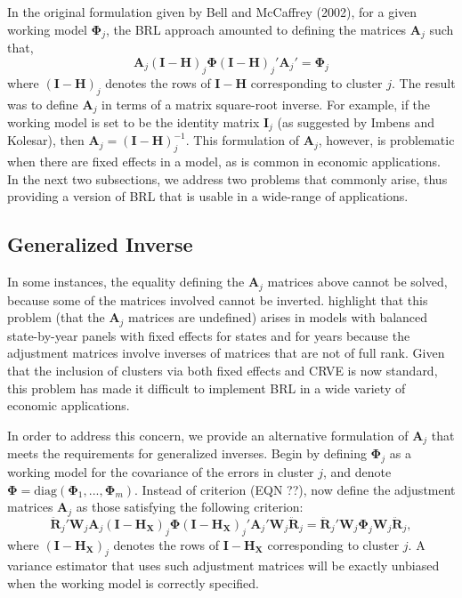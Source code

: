 \documentclass[12pt]{article}
\newcommand{\bm}{\mathbf}
\newcommand{\bs}{\boldsymbol}
\begin{document}
In the original formulation given by Bell and McCaffrey (2002), for a given working model $\bs\Phi_j$, the BRL approach amounted to defining the matrices $\bm{A}_j$ such that,
\begin{equation}
\label{eq:CR2_criterion_BMv}
\bm{A}_j \left(\bm{I} - \bm{H}\right)_j \bs\Phi \left(\bm{I} - \bm{H}\right)_j' \bm{A}_j'  =  \bs\Phi_j 
\end{equation}
where $\left(\bm{I} - \bm{H}\right)_j$ denotes the rows of $\bm{I} - \bm{H}$ corresponding to cluster $j$.
The result was to define $\bm{A}_j$ in terms of a matrix square-root inverse. 
For example, if the working model is set to be the identity matrix $\bm{I}_j$ (as suggested by Imbens and Kolesar), then $\bm{A}_j = \bm{(I - H)}_j^{-1}$. 
This formulation of $\bm{A}_j$, however, is problematic when there are fixed effects in a model, as is common in economic applications. 
In the next two subsections, we address two problems that commonly arise, thus providing a version of BRL that is usable in a wide-range of applications.

\subsection{Generalized Inverse}

In some instances, the equality defining the $\bm{A}_j$ matrices above cannot be solved, because some of the matrices involved cannot be inverted. 
\citet{Angrist2009mostly} highlight that this problem (that the $\bm{A}_j$ matrices are undefined) arises in models with balanced state-by-year panels with fixed effects for states and for years because the adjustment matrices involve inverses of matrices that are not of full rank. Given that the inclusion of clusters via both fixed effects and CRVE is now standard, this problem has made it difficult to implement BRL in a wide variety of economic applications. 

In order to address this concern, we provide an alternative formulation of $\bm{A}_j$ that meets the requirements for generalized inverses. 
Begin by defining $\bs\Phi_j$ as a working model for the covariance of the errors in cluster $j$, and denote $\bs\Phi = \text{diag}\left(\bs\Phi_1,...,\bs\Phi_m\right)$. Instead of criterion (EQN ??), now define the adjustment matrices $\bm{A}_j$ as those satisfying the following criterion:
\begin{equation}
\label{eq:CR2_criterion}
\bm{\ddot{R}}_j' \bm{W}_j \bm{A}_j \left(\bm{I} - \bm{H_X}\right)_j \bs\Phi \left(\bm{I} - \bm{H_X}\right)_j' \bm{A}_j' \bm{W}_j \bm{\ddot{R}}_j = \bm{\ddot{R}}_j' \bm{W}_j \bs\Phi_j \bm{W}_j \bm{\ddot{R}}_j,
\end{equation}
where $\left(\bm{I} - \bm{H_X}\right)_j$ denotes the rows of $\bm{I} - \bm{H_X}$ corresponding to cluster $j$. 
A variance estimator that uses such adjustment matrices will be exactly unbiased when the working model is correctly specified.
\end{document}
